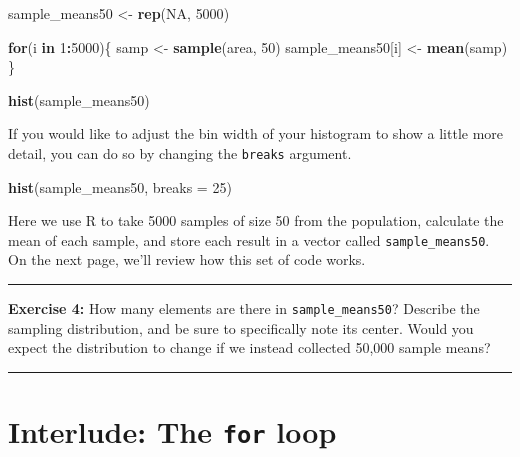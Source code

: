\documentclass[]{book}
\newenvironment{Shaded}{\begin{snugshade}}{\end{snugshade}}
\newcommand{\ControlFlowTok}[1]{\textcolor[rgb]{0.13,0.29,0.53}{\textbf{#1}}}
\newcommand{\DataTypeTok}[1]{\textcolor[rgb]{0.13,0.29,0.53}{#1}}
\newcommand{\DecValTok}[1]{\textcolor[rgb]{0.00,0.00,0.81}{#1}}
\newcommand{\KeywordTok}[1]{\textcolor[rgb]{0.13,0.29,0.53}{\textbf{#1}}}
\newcommand{\NormalTok}[1]{#1}
\newcommand{\OperatorTok}[1]{\textcolor[rgb]{0.81,0.36,0.00}{\textbf{#1}}}
\newcommand{\OtherTok}[1]{\textcolor[rgb]{0.56,0.35,0.01}{#1}}
\newcommand{\StringTok}[1]{\textcolor[rgb]{0.31,0.60,0.02}{#1}}
\theoremstyle{definition}
\theoremstyle{definition}
\theoremstyle{definition}
\theoremstyle{remark}
\begin{document}
\begin{Shaded}
\begin{Highlighting}[]
\NormalTok{sample_means50 <-}\StringTok{ }\KeywordTok{rep}\NormalTok{(}\OtherTok{NA}\NormalTok{, }\DecValTok{5000}\NormalTok{)}

\ControlFlowTok{for}\NormalTok{(i }\ControlFlowTok{in} \DecValTok{1}\OperatorTok{:}\DecValTok{5000}\NormalTok{)\{}
\NormalTok{   samp <-}\StringTok{ }\KeywordTok{sample}\NormalTok{(area, }\DecValTok{50}\NormalTok{)}
\NormalTok{   sample_means50[i] <-}\StringTok{ }\KeywordTok{mean}\NormalTok{(samp)}
\NormalTok{   \}}

\KeywordTok{hist}\NormalTok{(sample_means50)}
\end{Highlighting}
\end{Shaded}

If you would like to adjust the bin width of your histogram to show a
little more detail, you can do so by changing the \texttt{breaks}
argument.

\begin{Shaded}
\begin{Highlighting}[]
\KeywordTok{hist}\NormalTok{(sample_means50, }\DataTypeTok{breaks =} \DecValTok{25}\NormalTok{)}
\end{Highlighting}
\end{Shaded}

Here we use R to take 5000 samples of size 50 from the population,
calculate the mean of each sample, and store each result in a vector
called \texttt{sample\_means50}. On the next page, we'll review how this
set of code works.

\begin{center}\rule{0.5\linewidth}{\linethickness}\end{center}

\textbf{Exercise 4:} How many elements are there in
\texttt{sample\_means50}? Describe the sampling distribution, and be
sure to specifically note its center. Would you expect the distribution
to change if we instead collected 50,000 sample means?

\begin{center}\rule{0.5\linewidth}{\linethickness}\end{center}

\hypertarget{interlude-the-for-loop}{%
\section{\texorpdfstring{Interlude: The \texttt{for}
loop}{Interlude: The for loop}}\label{interlude-the-for-loop}}
\end{document}
